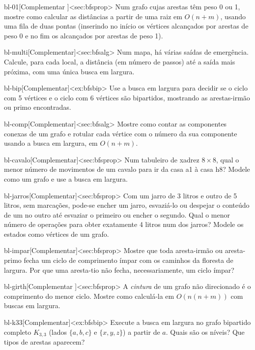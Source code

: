 \begin{exercicio}{bl-01}[Complementar \estrela]<sec:bfsprop>
Num grafo cujas arestas têm peso 0 ou 1, mostre como calcular as distâncias a partir de uma raiz em $O(n+m)$, usando uma fila de duas pontas (inserindo no início os vértices alcançados por arestas de peso 0 e no fim os alcançados por arestas de peso 1).
\end{exercicio}
\begin{exercicio}{bl-multi}[Complementar]<sec:bfsalg>
Num mapa, há várias saídas de emergência. Calcule, para cada local, a distância (em número de passos) até a saída mais próxima, com uma única busca em largura.
\end{exercicio}
\begin{exercicio}{bl-bip}[Complementar]<ex:bfsbip>
Use a busca em largura para decidir se o ciclo com 5 vértices e o ciclo com 6 vértices são bipartidos, mostrando as arestas-irmão ou primo encontradas.
\end{exercicio}
\begin{exercicio}{bl-comp}[Complementar]<sec:bfsalg>
Mostre como contar as componentes conexas de um grafo e rotular cada vértice com o número da sua componente usando a busca em largura, em $O(n+m)$.
\end{exercicio}
\begin{exercicio}{bl-cavalo}[Complementar]<sec:bfsprop>
Num tabuleiro de xadrez $8\times8$, qual o menor número de movimentos de um cavalo para ir da casa a1 à casa h8? Modele como um grafo e use a busca em largura.
\end{exercicio}
\begin{exercicio}{bl-jarros}[Complementar]<sec:bfsprop>
Com um jarro de 3 litros e outro de 5 litros, sem marcações, pode-se encher um jarro, esvaziá-lo ou despejar o conteúdo de um no outro até esvaziar o primeiro ou encher o segundo. Qual o menor número de operações para obter exatamente 4 litros num dos jarros? Modele os estados como vértices de um grafo.
\end{exercicio}
\begin{exercicio}{bl-impar}[Complementar]<sec:bfsprop>
Mostre que toda aresta-irmão ou aresta-primo fecha um ciclo de comprimento ímpar com os caminhos da floresta de largura. Por que uma aresta-tio não fecha, necessariamente, um ciclo ímpar?
\end{exercicio}
\begin{exercicio}{bl-girth}[Complementar \estrela]<sec:bfsprop>
A \emph{cintura} de um grafo não direcionado é o comprimento do menor ciclo. Mostre como calculá-la em $O(n(n+m))$ com buscas em largura.
\end{exercicio}
\begin{exercicio}{bl-k33}[Complementar]<ex:bfsbip>
Execute a busca em largura no grafo bipartido completo $K_{3,3}$ (lados $\{a,b,c\}$ e $\{x,y,z\}$) a partir de $a$. Quais são os níveis? Que tipos de arestas aparecem?
\end{exercicio}
